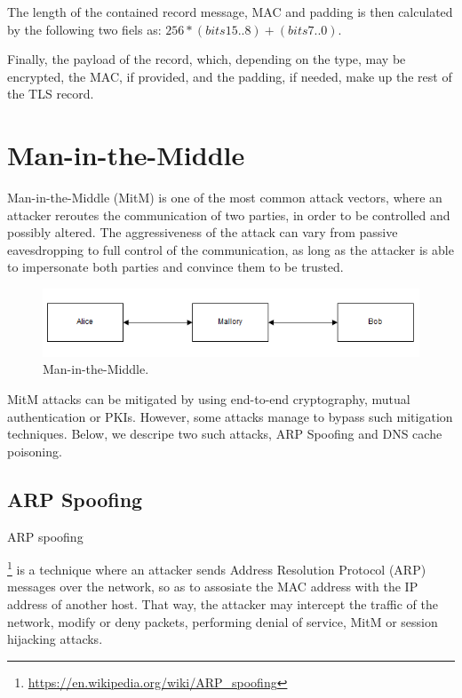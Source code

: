 The length of the contained record message, MAC and padding is then calculated
by the following two fiels as: \begin{math}256*(bits 15..8) + (bits
7..0)\end{math}.

Finally, the payload of the record, which, depending on the type, may be
encrypted, the MAC, if provided, and the padding, if needed, make up the rest of
the TLS record.

\section{Man-in-the-Middle}\label{sec:mitm}

Man-in-the-Middle (MitM) is one of the most common attack vectors, where an
attacker reroutes the communication of two parties, in order to be controlled
and possibly altered. The aggressiveness of the attack can vary from passive
eavesdropping to full control of the communication, as long as the attacker is
able to impersonate both parties and convince them to be trusted.

\begin{figure}[H] \caption{Man-in-the-Middle.} \centering
\includegraphics[width=1\textwidth]{diagrams/mitm.png}\end{figure}

MitM attacks can be mitigated by using end-to-end cryptography, mutual
authentication or PKIs. However, some attacks manage to bypass such mitigation
techniques. Below, we descripe two such attacks, ARP Spoofing and DNS cache
poisoning.

\subsection{ARP Spoofing} ARP spoofing

\footnote{\url{https://en.wikipedia.org/wiki/ARP_spoofing}} is a technique where
an attacker sends Address Resolution Protocol (ARP) messages over the network,
so as to assosiate the MAC address with the IP address of another host. That
way, the attacker may intercept the traffic of the network, modify or deny
packets, performing denial of service, MitM or session hijacking attacks.

